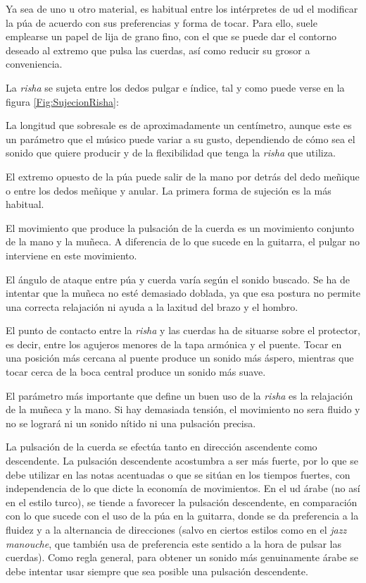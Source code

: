 Ya sea de uno u otro material, es habitual entre los intérpretes de ud el modificar la púa de acuerdo con sus preferencias y forma de tocar. Para ello, suele emplearse un papel de lija de grano fino, con el que se puede dar el contorno deseado al extremo que pulsa las cuerdas, así como reducir su grosor a conveniencia.

La \emph{risha} se sujeta entre los dedos pulgar e índice, tal y como puede verse en la figura \ref{Fig:SujecionRisha}:

La longitud que sobresale es de aproximadamente un centímetro, aunque este es un parámetro que el músico puede variar a su gusto, dependiendo de cómo sea el sonido que quiere producir y de la flexibilidad que tenga la \emph{risha} que utiliza.

El extremo opuesto de la púa puede salir de la mano por detrás del dedo meñique o entre los dedos meñique y anular. La primera forma de sujeción es la más habitual.

El movimiento que produce la pulsación de la cuerda es un movimiento conjunto de la mano y la muñeca. A diferencia de lo que sucede en la guitarra, el pulgar no interviene en este movimiento.

El ángulo de ataque entre púa y cuerda varía según el sonido buscado. Se ha de intentar que la muñeca no esté demasiado doblada, ya que esa postura no permite una correcta relajación ni ayuda a la laxitud del brazo y el hombro.

El punto de contacto entre la \emph{risha} y las cuerdas ha de situarse sobre el protector, es decir, entre los agujeros menores de la tapa armónica y el puente. Tocar en una posición más cercana al puente produce un sonido más áspero, mientras que tocar cerca de la boca central produce un sonido más suave.

El parámetro más importante que define un buen uso de la \emph{risha} es la relajación de la muñeca y la mano. Si hay demasiada tensión, el movimiento no sera fluido y no se logrará ni un sonido nítido ni una pulsación precisa.

La pulsación de la cuerda se efectúa tanto en dirección ascendente como descendente. La pulsación descendente acostumbra a ser más fuerte, por lo que se debe utilizar en las notas acentuadas o que se sitúan en los tiempos fuertes, con independencia de lo que dicte la economía de movimientos. En el ud árabe (no así en el estilo turco), se tiende a favorecer la pulsación descendente, en comparación con lo que sucede con el uso de la púa en la guitarra, donde se da preferencia a la fluidez y a la alternancia de direcciones (salvo en ciertos estilos como en el \emph{jazz manouche}, que también usa de preferencia este sentido a la hora de pulsar las cuerdas). Como regla general, para obtener un sonido más genuinamente árabe se debe intentar usar siempre que sea posible una pulsación descendente.

